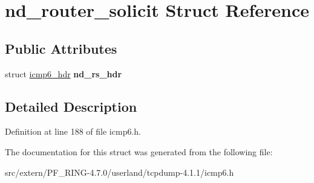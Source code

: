 \hypertarget{structnd__router__solicit}{
\section{nd\_\-router\_\-solicit Struct Reference}
\label{structnd__router__solicit}
}
\subsection*{Public Attributes}
\begin{DoxyCompactItemize}
\item 
\hypertarget{structnd__router__solicit_a4c41234065a7bbfa882b2bbf85e2181e}{
struct \hyperlink{structicmp6__hdr}{icmp6\_\-hdr} {\bfseries nd\_\-rs\_\-hdr}}
\label{structnd__router__solicit_a4c41234065a7bbfa882b2bbf85e2181e}

\end{DoxyCompactItemize}


\subsection{Detailed Description}


Definition at line 188 of file icmp6.h.



The documentation for this struct was generated from the following file:\begin{DoxyCompactItemize}
\item 
src/extern/PF\_\-RING-\/4.7.0/userland/tcpdump-\/4.1.1/icmp6.h\end{DoxyCompactItemize}
